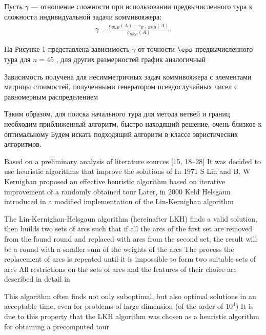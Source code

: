 \documentclass[12pt]{article}
\begin{document}
 Пусть $\gamma$ --- отношение сложности при использовании предвычисленного тура к сложности индивидуальной задачи коммивояжера: 
 \begin{align} 
 \gamma=\frac{c_{B\&B}(A)-c_{E+B\&B}(A)}{c_{B\&B}(A)}.\label{complexity_ratio} 
 \end{align}  
  
  
  
 На Рисунке 1 %
 представлена зависимость   $\gamma$  от точности $\eps$ предвычисленного тура  для $n=45$ \cite{MF}, для других размерностей график аналогичный

  
 Зависимость получена для несимметричных задач коммивояжера с элементами матрицы стоимостей, полученными генератором псевдослучайных чисел с равномерным распределением

  
 Таким образом, для поиска начального тура для метода ветвей и границ  необходим приближенный алгоритм, быстро находящий решение, очень близкое к оптимальному
Будем искать подходящий алгоритм в классе эвристических алгоритмов. 
 
 Based on a preliminary analysis of literature sources [15, 18--28] 
 It was decided to use heuristic algorithms that improve the solutions of
 In 1971
S
Lin and B. W
Kernighan \cite{LK25} proposed an effective heuristic algorithm based on iterative improvement of a randomly obtained tour
 Later, in 2000
Keld Helsgaun introduced in \cite{Helsgaun26} a modified implementation of the Lin-Kernighan algorithm
 
 The Lin-Kernighan-Helsgaun algorithm (hereinafter LKH) finds a valid solution, then builds two sets of arcs such that if all the arcs of the first set are removed from the found round and replaced with arcs from the second set, the result will be a round with a smaller sum of the weights of the arcs
The process the replacement of arcs is repeated until it is impossible to form two suitable sets of arcs
All restrictions on the sets of arcs and the features of their choice are described in detail in \cite{Helsgaun26}

 
 This algorithm often finds not only suboptimal, but also optimal solutions in an acceptable time, even for problems of large dimension (of the order of $10^4$)
It is due to this property that the LKH algorithm was chosen as a heuristic algorithm for obtaining a precomputed tour
 
\end{document}
